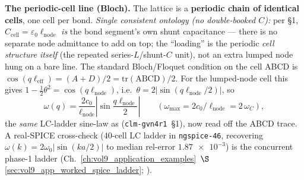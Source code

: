 \medskip\noindent\textbf{The periodic-cell line (Bloch).} The lattice is a \textbf{periodic chain of identical cells}, one cell per bond. \emph{Single consistent ontology (no double-booked $C$):} per §1, $C_{\mathrm{cell}}=\varepsilon_0\ell_{\mathrm{node}}$ \emph{is} the bond segment's own shunt capacitance --- there is no separate node admittance to add on top; the ``loading'' is the periodic \emph{cell structure itself} (the repeated series-$L$/shunt-$C$ unit), not an extra lumped node hung on a bare line. The standard Bloch/Floquet condition on the cell ABCD is $\cos(q\ell_{\mathrm{eff}})=(A+D)/2=\mathrm{tr(ABCD)}/2$. For the lumped-node cell this gives $1-\tfrac12\theta^2=\cos(q\ell_{\mathrm{node}})$, i.e.\ $\theta=2|\sin(q\ell_{\mathrm{node}}/2)|$, so
\begin{equation}
\omega(q)=\frac{2c_0}{\ell_{\mathrm{node}}}\left|\sin\frac{q\ell_{\mathrm{node}}}{2}\right|
\qquad(\omega_{\max}=2c_0/\ell_{\mathrm{node}}=2\,\omega_C),
\label{eq:vol9_loaded_line_bloch}
\end{equation}
the \emph{same} LC-ladder sine-law as  (\texttt{clm-gvn4r1}~\S1), now read off the ABCD trace. A real-SPICE cross-check (40-cell LC ladder in \texttt{ngspice-46}, recovering $\omega(k)=2\omega_0|\sin(ka/2)|$ to median rel-error $\num{1.87e-3}$) is the concurrent phase-1 ladder (Ch.~\ref{ch:vol9_application_examples}~$\S$\ref{sec:vol9_app_worked_spice_ladder}; ).

